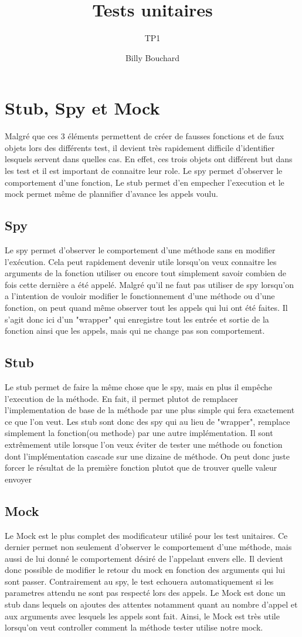\documentclass{article}
\title{Tests unitaires}
\subtitle{TP1}
\author{Billy Bouchard}{Jacob Dorais}{}
\begin{document}
\maketitle
\section*{Stub, Spy et Mock}
Malgré que ces 3 éléments permettent de créer de fausses fonctions et de faux objets lors des différents test, il devient très rapidement difficile d'identifier lesquels servent dans quelles cas.
En effet, ces trois objets ont différent but dans les test et il est important de connaitre leur role.
Le spy permet d'observer le comportement d'une fonction,
Le stub permet d'en empecher l'execution et le mock permet même de plannifier d'avance les appels voulu.
\subsection*{Spy}
Le spy permet d'observer le comportement d'une méthode sans en modifier l'exécution.
Cela peut rapidement devenir utile lorsqu'on veux connaitre les arguments de la fonction utiliser ou encore tout simplement savoir combien de fois cette dernière a été appelé.
Malgré qu'il ne faut pas utiliser de spy lorsqu'on a l'intention de vouloir modifier le fonctionnement d'une méthode ou d'une fonction, on peut quand même observer tout les appels qui lui ont été faites.
Il s'agit donc ici d'un "wrapper" qui enregistre tout les entrée et sortie de la fonction ainsi que les appels, mais qui ne change pas son comportement.
\subsection*{Stub}
Le stub permet de faire la même chose que le spy, mais en plus il empêche l'execution de la méthode.
En fait, il permet plutot de remplacer l'implementation de base de la méthode par une plus simple qui fera exactement ce que l'on veut.
Les stub sont donc des spy qui au lieu de "wrapper", remplace simplement la fonction(ou methode) par une autre implémentation.
Il sont extrêmement utile lorsque l'on veux éviter de tester une  méthode ou fonction dont l'implémentation cascade sur une dizaine de méthode.
On peut donc juste forcer le résultat de la première fonction plutot que de trouver quelle valeur envoyer
\subsection*{Mock}
Le Mock est le plus complet des modificateur utilisé pour les test unitaires.
Ce dernier permet non seulement d'observer le comportement d'une méthode, mais aussi de lui donné le comportement désiré de l'appelant envers elle.
Il devient donc possible de modifier le retour du mock en fonction des arguments qui lui sont passer.
Contrairement au spy, le test echouera automatiquement si les parametres attendu ne sont pas respecté lors des appels.
Le Mock est donc un stub dans lequels on ajoutes des attentes notamment quant au nombre d'appel et aux arguments avec lesquels les appels sont fait.
Ainsi, le Mock est très utile lorsqu'on veut controller comment la méthode tester utilise notre mock.
\end{document}
